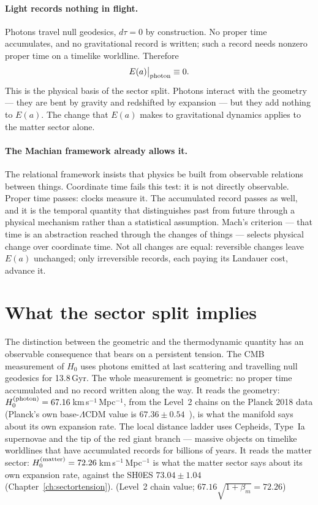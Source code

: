 \paragraph{Light records nothing in flight.} Photons travel null geodesics, $d\tau=0$ by construction. No proper time accumulates, and no gravitational
record is written; such a record needs nonzero proper time on a timelike worldline. Therefore
\begin{equation}
E(a)\big|_{\rm photon}\equiv0 .\label{eq:time_Ephoton}
\end{equation}
\derived{} This is the physical basis of the sector split. Photons interact with the geometry --- they are bent by gravity and redshifted by
expansion --- but they add nothing to $E(a)$. The change that $E(a)$ makes to gravitational dynamics applies to the matter sector alone.

\paragraph{The Machian framework already allows it.} The relational framework insists that physics be built from observable relations between things.
Coordinate time fails this test: it is not directly observable. Proper time passes: clocks measure it. The accumulated record passes as well, and it is
the temporal quantity that distinguishes past from future through a physical mechanism rather than a statistical assumption. Mach's criterion --- that
time is an abstraction reached through the changes of things --- selects physical change over coordinate time. Not all changes are equal: reversible
changes leave $E(a)$ unchanged; only irreversible records, each paying its Landauer cost, advance it. \interp

\section{What the sector split implies}\label{sec:time_split}
The distinction between the geometric and the thermodynamic quantity has an observable consequence that bears on a persistent tension. The CMB
measurement of $H_0$ uses photons emitted at last scattering and travelling null geodesics for 13.8\,Gyr. The whole measurement is geometric: no proper
time accumulated and no record written along the way. It reads the geometry: $H_0^{(\rm photon)}=67.16$\,km\,s$^{-1}$\,Mpc$^{-1}$, from the Level~2 chains on the Planck 2018 data
(Planck's own base-$\Lambda$CDM value is $67.36\pm0.54$~\cite{Planck2018VI}), is what the manifold says about its own expansion rate. \measured{} The local distance ladder uses Cepheids, Type~Ia supernovae and the tip of the red
giant branch --- massive objects on timelike worldlines that have accumulated records for billions of years. It reads the matter sector:
$H_0^{(\rm matter)}=72.26$\,km\,s$^{-1}$\,Mpc$^{-1}$ is what the matter sector says about its own expansion rate, against the
SH0ES $73.04\pm1.04$~\cite{Riess2022} (Chapter~\ref{ch:sectortension}). \calc{} (Level~2 chain value; $67.16\sqrt{1+\beta_m}=72.26$)

